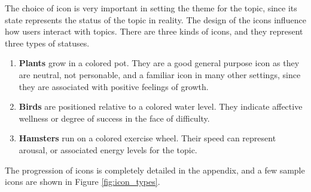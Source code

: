       The choice of icon is very important in setting
      the theme for the topic, since its state represents the status of the topic
      in reality.
      The design of the icons influence how users interact with topics.
      There are three kinds of icons, and they represent three types of statuses.
      \begin{enumerate}
      \item \textbf{Plants} grow in a colored pot. They are a good general purpose icon as they are neutral,
      not personable, and a familiar icon in many other settings,
      since they are associated with positive feelings of growth.
      \item \textbf{Birds} are positioned relative to a colored water level.
      They indicate affective wellness or degree of success in the face of difficulty.
      \item \textbf{Hamsters} run on a colored exercise wheel.
      Their speed can represent arousal,
      or associated energy levels for the topic.
      \end{enumerate}
      The progression of icons is completely detailed in the appendix,
      and a few sample icons are shown in Figure \ref{fig:icon_types}.

